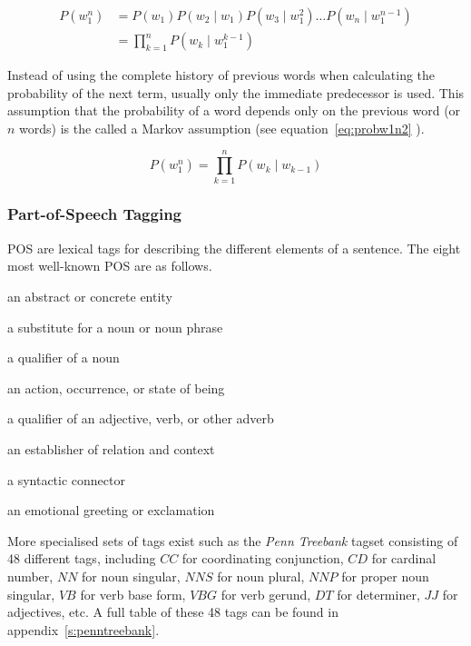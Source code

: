 \begin{equation}
  \begin{split}
  P(w_1^n) &= P(w_1)P(w_2 \mid w_1)P(w_3 \mid w_1^2 ) \ldots P(w_n \mid w_1^{n-1})\\
  &= \prod_{k=1}^{n}P(w_k \mid w_1^{k-1})
  \end{split}
  \label{eq:probw1n}
\end{equation}

Instead of using the complete history of previous words when calculating the probability of the next term, usually only the immediate predecessor is used. This assumption that the probability of a word\marginpar{$\bm{\Sigma}$~\ref{eq:probw1n2}} depends only on the previous word (or $n$ words) is the called a Markov assumption (see equation~\ref{eq:probw1n2} \autocite{Jurafsky2009}).

\begin{equation}
  P(w_1^n) = \prod_{k=1}^{n}P(w_k \mid w_{k-1})
  \label{eq:probw1n2}
\end{equation}


\subsubsection{Part-of-Speech Tagging}
\label{s:pos}

\ac{POS} are lexical tags for describing the different elements of a sentence. The eight most well-known \ac{POS} are as follows.

\begin{description}[leftmargin=2.75cm]
  \item [Noun] an abstract or concrete entity
  \item [Pronoun] a substitute for a noun or noun phrase
  \item [Adjective] a qualifier of a noun
  \item [Verb] an action, occurrence, or state of being
  \item [Adverb] a qualifier of an adjective, verb, or other adverb
  \item [Preposition] an establisher of relation and context
  \item [Conjunction] a syntactic connector
  \item [Interjection] an emotional greeting or exclamation
\end{description}

More specialised sets of tags exist such as the \textit{Penn Treebank} tagset \autocite{Marcus1993} consisting of 48 different tags, including $CC$ for coordinating conjunction, $CD$ for cardinal number, $NN$ for noun singular, $NNS$ for noun plural, $NNP$ for proper noun singular, $VB$ for verb base form, $VBG$ for verb gerund, $DT$ for determiner, $JJ$ for adjectives, etc. A full table of these 48 tags can be found in appendix~\ref{s:penntreebank}.

